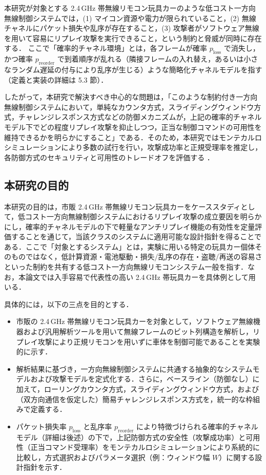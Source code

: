 \documentclass[twocolumn,10pt,a4paper]{jsarticle}
\begin{document}
本研究が対象とする 2.4\,GHz 帯無線リモコン玩具カーのような低コスト一方向無線制御システムでは，(1) マイコン資源や電力が限られていること，(2) 無線チャネルにパケット損失や乱序が存在すること，(3) 攻撃者がソフトウェア無線を用いて容易にリプレイ攻撃を実行できること，という制約と脅威が同時に存在する．
ここで「確率的チャネル環境」とは，各フレームが確率 $p_{\mathrm{loss}}$ で消失し，かつ確率 $p_{\mathrm{reorder}}$ で到着順序が乱れる（隣接フレームの入れ替え，あるいは小さなランダム遅延の付与により乱序が生じる）ような簡略化チャネルモデルを指す（定義と実装の詳細は 5.3 節）．

したがって，本研究で解決すべき中心的な問題は，「このような制約付き一方向無線制御システムにおいて，単純なカウンタ方式，スライディングウィンドウ方式，チャレンジレスポンス方式などの防御メカニズムが，上記の確率的チャネルモデル下でどの程度リプレイ攻撃を抑止しつつ，正当な制御コマンドの可用性を維持できるかを明らかにすること」である．そのため，本研究ではモンテカルロシミュレーションにより多数の試行を行い，攻撃成功率と正規受理率を推定し，各防御方式のセキュリティと可用性のトレードオフを評価する \cite{Serena2025SimCyber}．

\subsection{本研究の目的}

本研究の目的は，市販 2.4\,GHz 帯無線リモコン玩具カーをケーススタディとして，低コスト一方向無線制御システムにおけるリプレイ攻撃の成立要因を明らかにし，確率的チャネルモデルの下で軽量なアンチリプレイ機能の有効性を定量評価することを通じて，当該クラスのシステムに適用可能な設計指針を得ることである．ここで「対象とするシステム」とは，実験に用いる特定の玩具カー個体そのものではなく，低計算資源・電池駆動・損失/乱序の存在・盗聴/再送の容易さといった制約を共有する低コスト一方向無線リモコンシステム一般を指す．なお，本論文では入手容易で代表性の高い 2.4\,GHz 帯玩具カーを具体例として用いる．

具体的には，以下の三点を目的とする．
\begin{itemize}
\item 市販の 2.4\,GHz 帯無線リモコン玩具カーを対象として，ソフトウェア無線機器および汎用解析ツールを用いて無線フレームのビット列構造を解析し，リプレイ攻撃により正規リモコンを用いずに車体を制御可能であることを実験的に示す．
\item 解析結果に基づき，一方向無線制御システムに共通する抽象的なシステムモデルおよび攻撃モデルを定式化する．さらに，ベースライン（防御なし）に加えて，ローリングカウンタ方式，スライディングウィンドウ方式，および（双方向通信を仮定した）簡易チャレンジレスポンス方式を，統一的な枠組みで定義する．
\item パケット損失率 $p_{\mathrm{loss}}$ と乱序率 $p_{\mathrm{reorder}}$ により特徴づけられる確率的チャネルモデル（詳細は後述）の下で，上記防御方式の安全性（攻撃成功率）と可用性（正当コマンド受理率）をモンテカルロシミュレーションにより系統的に比較し，方式選択およびパラメータ選択（例：ウィンドウ幅 $W$）に関する設計指針を示す．
\end{itemize}
\end{document}
